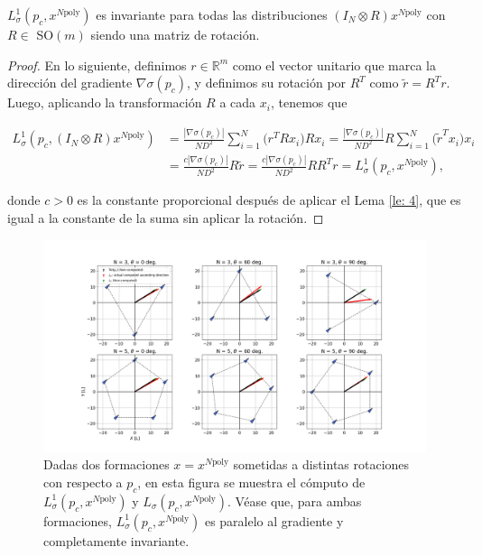 \begin{prop}
\label{pro: RL1}
$L^1_\sigma(p_c, x^{N\text{poly}})$ es invariante para todas las distribuciones $(I_N \otimes R)x^{N\text{poly}}$ con $R\in$ SO$(m)$ siendo una matriz de rotación.
\end{prop}
\begin{proof}
En lo siguiente, definimos $r\in\mathbb{R}^m$ como el vector unitario que marca la dirección del gradiente $\nabla\sigma(p_c)$, y definimos su rotación por $R^T$ como $\tilde r = R^Tr$. Luego, aplicando la transformación $R$ a cada $x_i$, tenemos que

\begin{align}
L^1_\sigma(p_c,(I_N \otimes R) x^{N\text{poly}}) &= \frac{|\nabla\sigma(p_c)|}{ND^2}\sum_{i=1}^N \Big(r^T Rx_i\Big)Rx_i = \frac{|\nabla\sigma(p_c)|}{ND^2}R\sum_{i=1}^N \Big(\tilde r^Tx_i\Big)x_i  \nonumber \\
&= \frac{c|\nabla\sigma(p_c)|}{ND^2}R \tilde r = \frac{c|\nabla\sigma(p_c)|}{ND^2}RR^T r = L^1_\sigma(p_c, x^{N\text{poly}}), \nonumber
\end{align}

donde $c > 0$ es la constante proporcional después de aplicar el Lema \ref{le: 4}, que es igual a la constante de la suma sin aplicar la rotación.
\end{proof}

\begin{figure}[!h]
\centering
\includegraphics[trim={0 0 0 0}, clip, width=1\columnwidth]{./fig/prop3.png}
\caption{Dadas dos formaciones $x = x^{N\text{poly}}$ sometidas a distintas rotaciones con respecto a $p_c$, en esta figura se muestra el cómputo de $L^1_\sigma(p_c, x^{N\text{poly}})$ y $L_\sigma(p_c, x^{N\text{poly}})$. Véase que, para ambas formaciones, $L^1_\sigma(p_c, x^{N\text{poly}})$ es paralelo al gradiente y completamente invariante.}
\label{fig: ss_prop3}
\end{figure}  

